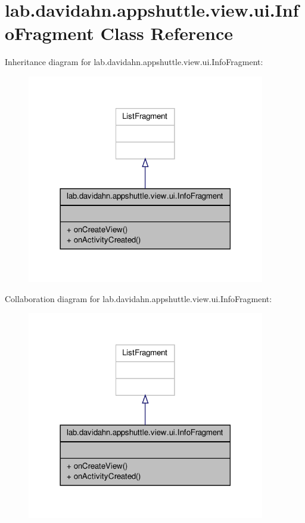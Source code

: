 \hypertarget{classlab_1_1davidahn_1_1appshuttle_1_1view_1_1ui_1_1_info_fragment}{\section{lab.\-davidahn.\-appshuttle.\-view.\-ui.\-Info\-Fragment \-Class \-Reference}
\label{classlab_1_1davidahn_1_1appshuttle_1_1view_1_1ui_1_1_info_fragment}
}


\-Inheritance diagram for lab.\-davidahn.\-appshuttle.\-view.\-ui.\-Info\-Fragment\-:
\nopagebreak
\begin{figure}[H]
\begin{center}
\leavevmode
\includegraphics[width=294pt]{classlab_1_1davidahn_1_1appshuttle_1_1view_1_1ui_1_1_info_fragment__inherit__graph}
\end{center}
\end{figure}


\-Collaboration diagram for lab.\-davidahn.\-appshuttle.\-view.\-ui.\-Info\-Fragment\-:
\nopagebreak
\begin{figure}[H]
\begin{center}
\leavevmode
\includegraphics[width=294pt]{classlab_1_1davidahn_1_1appshuttle_1_1view_1_1ui_1_1_info_fragment__coll__graph}
\end{center}
\end{figure}
